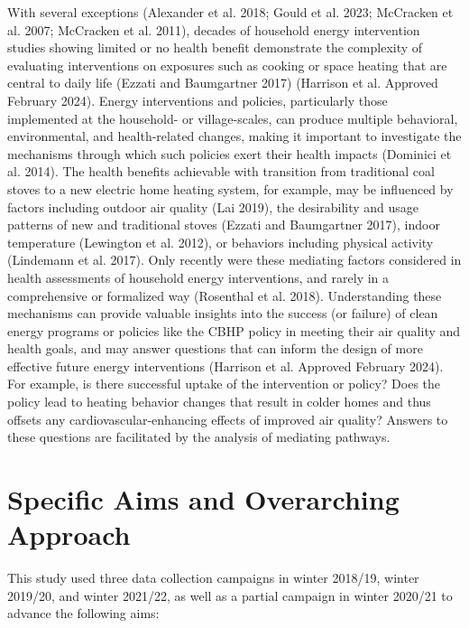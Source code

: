 \documentclass[
  letterpaper,
  DIV=11,
  numbers=noendperiod]{scrartcl}
\begin{document}
With several exceptions (Alexander et al. 2018; Gould et al. 2023;
McCracken et al. 2007; McCracken et al. 2011), decades of household
energy intervention studies showing limited or no health benefit
demonstrate the complexity of evaluating interventions on exposures such
as cooking or space heating that are central to daily life (Ezzati and
Baumgartner 2017) (Harrison et al. Approved February 2024). Energy
interventions and policies, particularly those implemented at the
household- or village-scales, can produce multiple behavioral,
environmental, and health-related changes, making it important to
investigate the mechanisms through which such policies exert their
health impacts (Dominici et al. 2014). The health benefits achievable
with transition from traditional coal stoves to a new electric home
heating system, for example, may be influenced by factors including
outdoor air quality (Lai 2019), the desirability and usage patterns of
new and traditional stoves (Ezzati and Baumgartner 2017), indoor
temperature (Lewington et al. 2012), or behaviors including physical
activity (Lindemann et al. 2017). Only recently were these mediating
factors considered in health assessments of household energy
interventions, and rarely in a comprehensive or formalized way
(Rosenthal et al. 2018). Understanding these mechanisms can provide
valuable insights into the success (or failure) of clean energy programs
or policies like the CBHP policy in meeting their air quality and health
goals, and may answer questions that can inform the design of more
effective future energy interventions (Harrison et al. Approved February
2024). For example, is there successful uptake of the intervention or
policy? Does the policy lead to heating behavior changes that result in
colder homes and thus offsets any cardiovascular-enhancing effects of
improved air quality? Answers to these questions are facilitated by the
analysis of mediating pathways.

\hypertarget{specific-aims-and-overarching-approach}{%
\section{Specific Aims and Overarching
Approach}\label{specific-aims-and-overarching-approach}}

This study used three data collection campaigns in winter 2018/19,
winter 2019/20, and winter 2021/22, as well as a partial campaign in
winter 2020/21 to advance the following aims:
\end{document}

